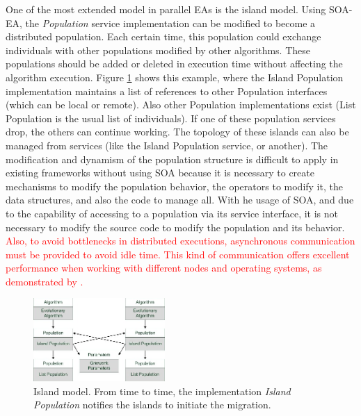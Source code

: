 One of the most extended model in parallel EAs is the island model. Using SOA-EA, the {\em Population} service implementation can be modified to become a distributed population. Each certain time, this population could exchange individuals with other populations modified by other algorithms. These populations should be added or deleted in execution time without affecting the algorithm execution. Figure \ref{POPULATION} shows this example, where the Island Population implementation maintains a list of references to other Population interfaces (which can be local or remote). Also other Population implementations exist (List Population is the usual list of individuals). If one of these population services drop, the others can continue working. The topology of these islands can also be managed from services (like the Island Population service, or another). The  modification and dynamism of the population structure is difficult to apply in existing frameworks without using SOA because it is necessary to create mechanisms to modify the population behavior, the operators to modify it, the data structures, and also the code to manage all. With he usage of SOA, and due to the capability of accessing to a population via its service interface, it is not necessary to modify the source code to modify the population and its behavior. \textcolor{red}{Also, to avoid bottlenecks in distributed executions, asynchronous communication must be provided to avoid idle time. This kind of communication offers excellent performance when working with different nodes and operating systems, as demonstrated by \cite{HETEROGENEOUS}.}



\begin{figure}
\centering
\includegraphics[width=5cm]{gfx/soaea/population.jpg}
\caption{Island model. From time to time, the implementation {\em Island Population} notifies the islands to initiate the migration.}
\label{POPULATION}
\end{figure}



